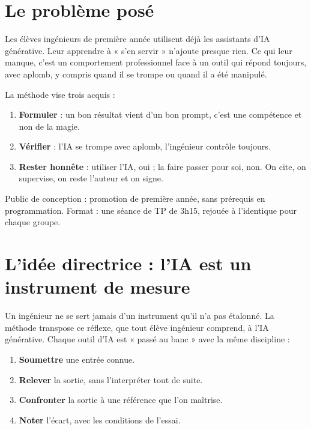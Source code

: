 \documentclass[11pt,a4paper]{article}
\begin{document}
\newpage
\section{Le problème posé}

Les élèves ingénieurs de première année utilisent déjà les assistants d'IA générative. Leur
apprendre à « s'en servir » n'ajoute presque rien. Ce qui leur manque, c'est un comportement
professionnel face à un outil qui répond toujours, avec aplomb, y compris quand il se trompe ou
quand il a été manipulé.

La méthode vise trois acquis :
\begin{enumerate}
\item \textbf{Formuler} : un bon résultat vient d'un bon prompt, c'est une compétence et non de la magie.
\item \textbf{Vérifier} : l'IA se trompe avec aplomb, l'ingénieur contrôle toujours.
\item \textbf{Rester honnête} : utiliser l'IA, oui ; la faire passer pour soi, non. On cite, on
supervise, on reste l'auteur et on signe.
\end{enumerate}

Public de conception : promotion de première année, sans prérequis en programmation. Format :
une séance de TP de 3h15, rejouée à l'identique pour chaque groupe.

\section{L'idée directrice : l'IA est un instrument de mesure}

Un ingénieur ne se sert jamais d'un instrument qu'il n'a pas étalonné. La méthode transpose ce
réflexe, que tout élève ingénieur comprend, à l'IA générative. Chaque outil d'IA est « passé au
banc » avec la même discipline :

\begin{cadre}
\begin{enumerate}[leftmargin=6mm]
\item \textbf{Soumettre} une entrée connue.
\item \textbf{Relever} la sortie, sans l'interpréter tout de suite.
\item \textbf{Confronter} la sortie à une référence que l'on maîtrise.
\item \textbf{Noter} l'écart, avec les conditions de l'essai.
\end{enumerate}
\end{cadre}
\end{document}
